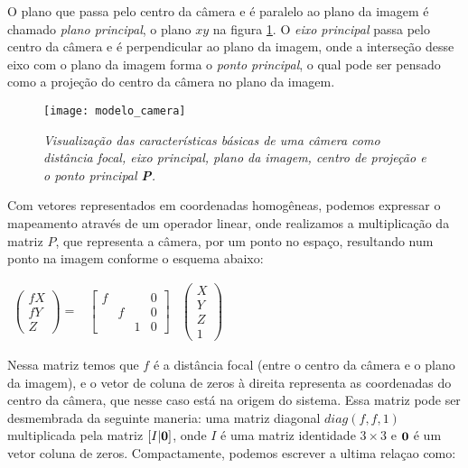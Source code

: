 O plano que passa pelo centro da câmera e é paralelo ao plano da imagem é chamado \textit{plano principal}, o plano $xy$ na figura \ref{camera}. O \textit{eixo principal} passa pelo centro da câmera e é perpendicular ao plano da imagem, onde a interseção desse eixo com o plano da imagem forma o \textit{ponto principal}, o qual pode ser pensado como a projeção do centro da câmera no plano da imagem.


\begin{figure}[!htb]
\centering
\texttt{[image: modelo\_camera]}
\caption{\textit{Visualização das características básicas de uma câmera como distância focal, eixo principal, plano da imagem, centro de projeção e o ponto principal {\bf P}.}}
\label{camera}
\end{figure}

Com vetores representados em coordenadas homogêneas, podemos expressar o mapeamento através de um operador linear, onde realizamos a multiplicação da matriz $P$, que representa a câmera, por um ponto no espaço, resultando num ponto na imagem conforme o esquema abaixo:

\begin{center}
$
\begin{array}{ccc}
\begin{pmatrix}
fX\\
fY\\
Z
\end{pmatrix} = 
&
\begin{bmatrix}
f& & &0\\
 &f& &0\\
 & &1&0
\end{bmatrix}
&
\begin{pmatrix}
X\\
Y\\
Z\\
1
\end{pmatrix}
\end{array}
$
\end{center}

Nessa matriz temos que $f$ é a distância focal (entre o centro da câmera e o plano da imagem), e o vetor de coluna de zeros à direita representa as coordenadas do centro da câmera, que nesse caso está na origem do sistema. Essa matriz pode ser desmembrada da seguinte maneria: uma matriz diagonal $diag(f,f,1)$ multiplicada pela matriz $[I|{\bf 0}]$, onde $I$ é uma matriz identidade $3\times3$ e ${\bf 0}$ é um vetor coluna de zeros. Compactamente, podemos escrever a ultima relaçao como:

